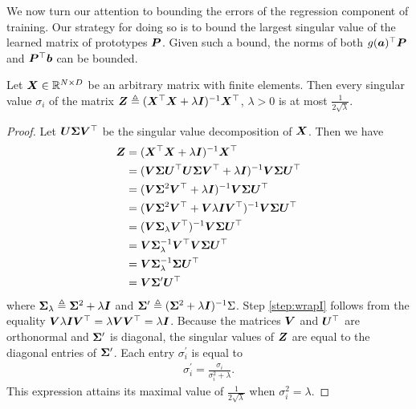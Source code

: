 We now turn our attention to bounding the errors of the regression component of training. Our strategy for doing so is to bound the largest singular value of the learned matrix of prototypes $\P$. Given such a bound, the norms of both $g(\a)^\top \P$ and $\P^\top \b$ can be bounded.

\begin{lemma} \label{lemma:pinvBound}
Let $\X \in \R^{N \times D}$
be an arbitrary matrix with finite elements. Then every singular value $\sigma_i$ of the matrix $\Z \triangleq (\X^\top \X + \lambda \mat{I})^{-1} \X^\top$, $\lambda > 0$ is at most $\frac{1}{2\sqrt{\lambda}}$.
\end{lemma}
\begin{proof} Let $\U \Sigm \Vt$ be the singular value decomposition of $\X$. Then we have
\begin{align}
    \Z &= (\X^\top \X + \lambda \I)^{-1} \X^\top   \\
    &= (\V \Sigm \Ut \U \Sigm \Vt + \lambda \I)^{-1} \V \Sigm \Ut \\
    &= (\V \Sigm^2 \Vt + \lambda \I)^{-1} \V \Sigm \Ut \\
    &= (\V \Sigm^2 \Vt + \V \lambda \I \Vt)^{-1} \V \Sigm \Ut \label{step:wrapI} \\
    &= (\V \Sigm_\lambda \Vt)^{-1} \V \Sigm \Ut \\
    &= \V \Sigm_\lambda^{-1} \Vt \V \Sigm \Ut \\
    &= \V \Sigm_\lambda^{-1} \Sigm \Ut \\
    &= \V \Sigm^\prime \Ut
\end{align}
where $\Sigm_\lambda \triangleq \Sigm^2 + \lambda \I$ and $\Sigm^\prime \triangleq (\Sigm^2 + \lambda \I)^{-1} \Sig$. Step \ref{step:wrapI} follows from the equality $\V \lambda \I \Vt = \lambda \V \Vt = \lambda \I$. Because the matrices $\V$ and $\Ut$ are orthonormal and $\Sigm^\prime$ is diagonal, the singular values of $\Z$ are equal to the diagonal entries of $\Sigm^\prime$. Each entry $\sigma_i^\prime$ is equal to
\begin{align}
    \sigma_i^\prime = \frac{\sigma_i}{\sigma_i^2 + \lambda}.
\end{align}
This expression attains its maximal value of $\frac{1}{2\sqrt{\lambda}}$ when $\sigma_i^2 = \lambda$.
\end{proof}

